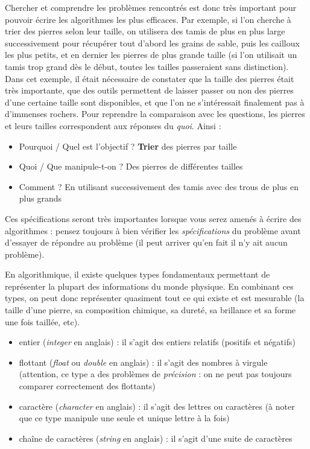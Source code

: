 \documentclass[11pt,a4paper]{article}
\begin{document}
\medskip

Chercher et comprendre les problèmes rencontrés est donc très important pour pouvoir écrire les algorithmes les plus efficaces.
Par exemple, si l'on cherche à trier des pierres selon leur taille, on utilisera des tamis de plus en plus large successivement pour récupérer tout d'abord les grains de sable, puis les cailloux les plus petits, et en dernier les pierres de plus grande taille (si l'on utilisait un tamis trop grand dès le début, toutes les tailles passeraient sans distinction).
Dans cet exemple, il était nécessaire de constater que la taille des pierres était très importante, que des outils permettent de laisser passer ou non des pierres d'une certaine taille sont disponibles, et que l'on ne s'intéressait finalement pas à d'immenses rochers.
Pour reprendre la comparaison avec les questions, les pierres et leurs tailles correspondent aux réponses du \textit{quoi}.
Ainsi :
\begin{itemize}
\item Pourquoi / Quel est l'objectif ? \textbf{Trier} des pierres par taille
\item Quoi / Que manipule-t-on ? Des pierres de différentes tailles
\item Comment ? En utilisant successivement des tamis avec des trous de plus en plus grands
\end{itemize}

\medskip

Ces spécifications seront très importantes lorsque vous serez amenés à écrire des algorithmes : pensez toujours à bien vérifier les \textit{spécifications} du problème avant d'essayer de répondre au problème (il peut arriver qu'en fait il n'y ait aucun problème).

\bigskip

En algorithmique, il existe quelques types fondamentaux permettant de représenter la plupart des informations du monde physique.
En combinant ces types, on peut donc représenter quasiment tout ce qui existe et est mesurable (la taille d'une pierre, sa composition chimique, sa dureté, sa brillance et sa forme une fois taillée, etc).

\begin{itemize}
\item entier (\textit{integer} en anglais) : il s'agit des entiers relatifs (positifs et négatifs)
\item flottant (\textit{float} ou \textit{double} en anglais) : il s'agit des nombres à virgule (attention, ce type a des problèmes de \textit{précision} : on ne peut pas toujours comparer correctement des flottants)
\item caractère (\textit{character} en anglais) : il s'agit des lettres ou caractères (à noter que ce type manipule une seule et unique lettre à la fois)
\item chaîne de caractères (\textit{string} en anglais) : il s'agit d'une suite de caractères
\end{itemize}
\end{document}
